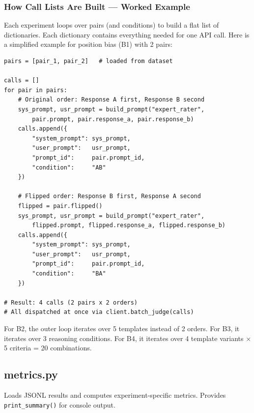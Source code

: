 \documentclass[11pt,a4paper]{article}
\begin{document}
\subsubsection*{How Call Lists Are Built --- Worked Example}

Each experiment loops over pairs (and conditions) to build a flat list of
dictionaries. Each dictionary contains everything needed for one API call.
Here is a simplified example for position bias (B1) with 2 pairs:

\begin{codebox}
\begin{lstlisting}
pairs = [pair_1, pair_2]   # loaded from dataset

calls = []
for pair in pairs:
    # Original order: Response A first, Response B second
    sys_prompt, usr_prompt = build_prompt("expert_rater",
        pair.prompt, pair.response_a, pair.response_b)
    calls.append({
        "system_prompt": sys_prompt,
        "user_prompt":   usr_prompt,
        "prompt_id":     pair.prompt_id,
        "condition":     "AB"
    })

    # Flipped order: Response B first, Response A second
    flipped = pair.flipped()
    sys_prompt, usr_prompt = build_prompt("expert_rater",
        flipped.prompt, flipped.response_a, flipped.response_b)
    calls.append({
        "system_prompt": sys_prompt,
        "user_prompt":   usr_prompt,
        "prompt_id":     pair.prompt_id,
        "condition":     "BA"
    })

# Result: 4 calls (2 pairs x 2 orders)
# All dispatched at once via client.batch_judge(calls)
\end{lstlisting}
\end{codebox}

For B2, the outer loop iterates over 5 templates instead of 2 orders.
For B3, it iterates over 3 reasoning conditions.
For B4, it iterates over 4 template variants $\times$ 5 criteria = 20 combinations.


\subsection{metrics.py}

\begin{modulebox}
Loads JSONL results and computes experiment-specific metrics. Provides
\texttt{print\_summary()} for console output.
\end{modulebox}
\end{document}
